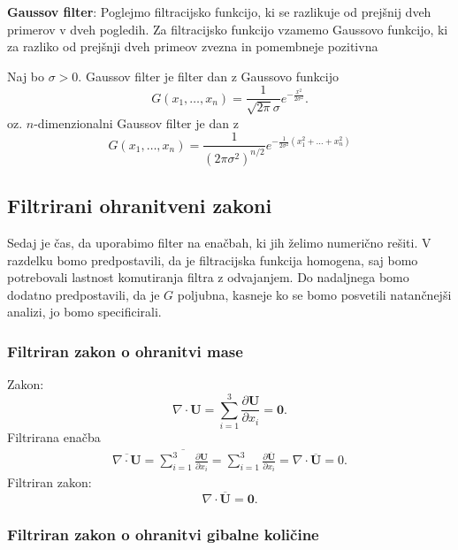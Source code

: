 \documentclass[mat2, tisk]{fmfdelo}
\newcommand{\bd}{\textbf}
\begin{document}
\noindent
\textbf{Gaussov filter}:
Poglejmo filtracijsko funkcijo, ki se razlikuje od prejšnij dveh primerov v dveh pogledih.
Za filtracijsko funkcijo vzamemo Gaussovo funkcijo, ki za razliko od prejšnji dveh 
primeov zvezna in pomembneje pozitivna
\begin{definicija}
Naj bo $\sigma > 0$. Gaussov filter je filter dan z Gaussovo funkcijo 
\begin{equation}
G(x_1, \dots, x_n) = \frac{1}{\sqrt{2\pi}\sigma} e^{-\frac{x^2}{2\sigma^2}}.
\end{equation}
oz. $n$-dimenzionalni Gaussov filter je dan z 
\begin{equation}
G(x_1, \dots, x_n) = \frac{1}{(2\pi \sigma^2)^{n/2}} e^{-\frac{1}{2\sigma^2}(x_1^2 + \dots + x_n^2)}
\end{equation}
\end{definicija}


\subsection{Filtrirani ohranitveni zakoni}

Sedaj je čas, da uporabimo filter na enačbah, ki jih želimo numerično rešiti. V 
razdelku bomo predpostavili, da je filtracijska funkcija homogena, saj bomo potrebovali 
lastnost komutiranja filtra z odvajanjem. Do nadaljnega bomo dodatno predpostavili, 
da je $G$ poljubna, kasneje ko se bomo posvetili natančnejši analizi, jo bomo specificirali.

\subsubsection{Filtriran zakon o ohranitvi mase}

Zakon:
$$
\nabla\cdot \bd{U} = \sum_{i=1}^3 \frac{\partial \bd{U}}{\partial x_i} = \bd{0}.
$$
\noindent
Filtrirana enačba 
\begin{align*}
\overline{\nabla\cdot \bd{U}}= \overline{\sum_{i=1}^3 \frac{\partial \bd{U}}{\partial x_i}} = 
\sum_{i=1}^3 \frac{\partial \overline{\bd{U}}}{\partial x_i} = \nabla\cdot \overline{\bd{U}} = 0.
\end{align*}
\noindent
Filtriran zakon:
\begin{equation}
\nabla\cdot\overline{\bd{U}} = \bd{0}.
\end{equation}

\subsubsection{Filtriran zakon o ohranitvi gibalne količine}
\end{document}
